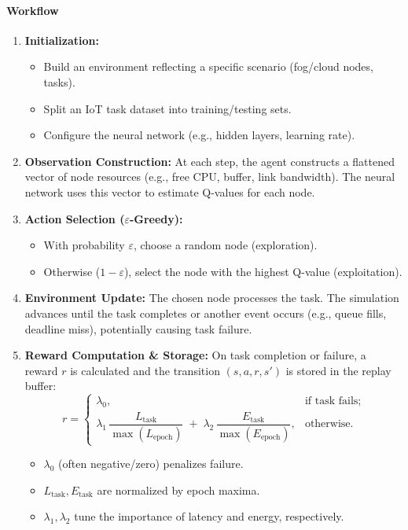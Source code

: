 \paragraph{Workflow}
\begin{enumerate}
    \item \textbf{Initialization:}
    \begin{itemize}
        \item Build an environment reflecting a specific scenario (fog/cloud nodes, tasks).
        \item Split an IoT task dataset into training/testing sets.
        \item Configure the neural network (e.g., hidden layers, learning rate).
    \end{itemize}

    \item \textbf{Observation Construction:}
    At each step, the agent constructs a flattened vector of node resources (e.g., free CPU, buffer, link bandwidth). The neural network uses this vector to estimate Q-values for each node.

    \item \textbf{Action Selection (\(\varepsilon\)-Greedy):}
    \begin{itemize}
        \item With probability \(\varepsilon\), choose a random node (exploration).
        \item Otherwise (\(1-\varepsilon\)), select the node with the highest Q-value (exploitation).
    \end{itemize}

    \item \textbf{Environment Update:}
    The chosen node processes the task. The simulation advances until the task completes or another event occurs (e.g., queue fills, deadline miss), potentially causing task failure.

    \item \textbf{Reward Computation \& Storage:}
    On task completion or failure, a reward \(r\) is calculated and the transition \((s,a,r,s')\) is stored in the replay buffer:
    \[
    \textit{r} = 
    \begin{cases}
    \lambda_0, & \text{if task fails};\\[4pt]
    \lambda_1 \,\dfrac{L_{\text{task}}}{\max(L_{\text{epoch}})} 
    \;+\;
    \lambda_2 \,\dfrac{E_{\text{task}}}{\max(E_{\text{epoch}})},
    & \text{otherwise}.
    \end{cases}
    \]
    \begin{itemize}
        \item \(\lambda_0\) (often negative/zero) penalizes failure.
        \item \(L_{\text{task}}, E_{\text{task}}\) are normalized by epoch maxima.
        \item \(\lambda_1, \lambda_2\) tune the importance of latency and energy, respectively.
    \end{itemize}


\end{enumerate}

